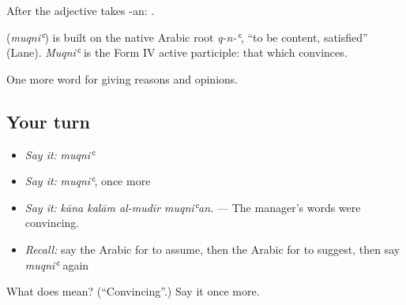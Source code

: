 After  the adjective takes -an:  .

\begin{cousinweb}
\textbf{} (\emph{muqniʿ}) is built on the native Arabic root \emph{q-n-ʿ}, \textquotedblleft{}to be content, satisfied\textquotedblright{} (Lane). \emph{Muqniʿ} is the Form IV active participle: that which convinces.
\end{cousinweb}

\begin{grammarlens}[title={What you've built}]
One more word for giving reasons and opinions.
\end{grammarlens}

\subsection*{Your turn}
\begin{itemize}
\raggedright
  \item \emph{Say it:} \emph{muqniʿ}
  \item \emph{Say it:} \emph{muqniʿ}, once more
  \item \emph{Say it:} \emph{kāna kalām al-mudīr muqniʿan.} — The manager's words were convincing.
  \item \emph{Recall:} say the Arabic for to assume, then the Arabic for to suggest, then say \emph{muqniʿ} again
\end{itemize}

\begin{tcolorbox}[breakable,colback=teal!4,colframe=teal!35!black,title={Before you move on}]
What does  mean? (\textquotedblleft{}Convincing\textquotedblright{}.) Say it once more.
\end{tcolorbox}
